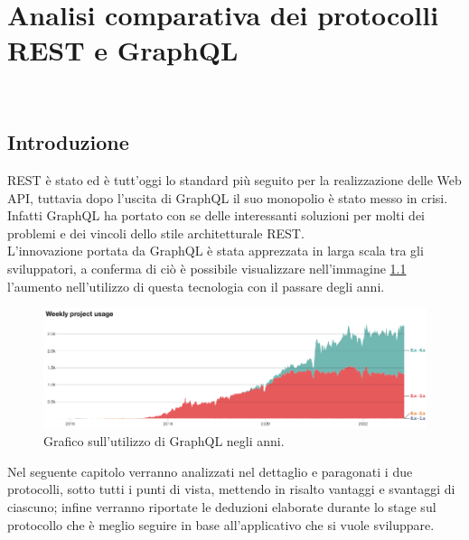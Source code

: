 
\chapter{Analisi comparativa dei protocolli REST e GraphQL}
\label{cap:analisi-comparativa}
\\
\section{Introduzione}
REST è stato ed è tutt'oggi lo standard più seguito per la realizzazione delle Web API, tuttavia dopo l'uscita di GraphQL il suo monopolio è stato messo in crisi. Infatti GraphQL ha portato con se delle interessanti soluzioni per molti dei problemi e dei vincoli dello stile architetturale REST.\\
L'innovazione portata da GraphQL è stata apprezzata in larga scala tra gli sviluppatori, a conferma di ciò è possibile visualizzare nell'immagine \ref{graphQL-usage-chart} l'aumento nell'utilizzo di questa tecnologia con il passare degli anni.
\FloatBarrier
\begin{figure}[!ht]
\centering
\includegraphics[width=1\linewidth]{immagini/GraphQLUsageChart.png}
\caption{Grafico sull'utilizzo di GraphQL negli anni.}
\label{graphQL-usage-chart}
\end{figure}
\FloatBarrier
Nel seguente capitolo verranno analizzati nel dettaglio e paragonati i due protocolli, sotto tutti i punti di vista, mettendo in risalto vantaggi e svantaggi di ciascuno; infine verranno riportate le deduzioni elaborate durante lo stage sul protocollo che è meglio seguire in base all'applicativo che si vuole sviluppare.
